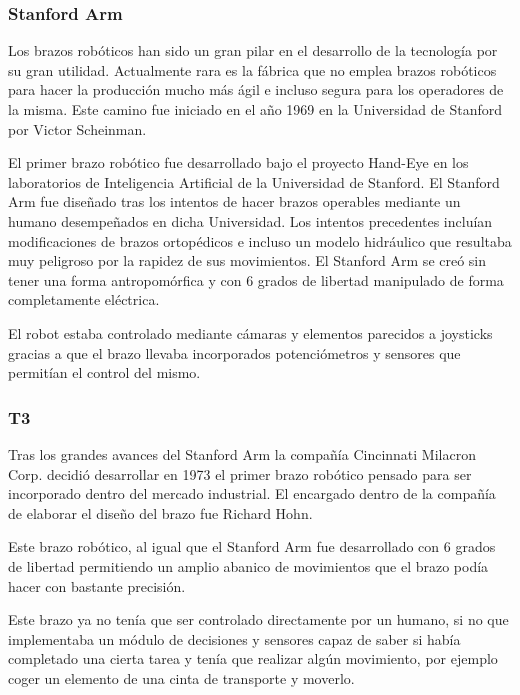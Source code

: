\subsubsection{Stanford Arm}

Los brazos robóticos han sido un gran pilar en el desarrollo de la tecnología por su gran utilidad. Actualmente rara es la fábrica que no emplea brazos robóticos para hacer la producción mucho más ágil e incluso segura para los operadores de la misma. Este camino fue iniciado en el año 1969 en la Universidad de Stanford por Victor Scheinman.

\vspace{10px}

El primer brazo robótico fue desarrollado bajo el proyecto Hand-Eye en los laboratorios de Inteligencia Artificial de la Universidad de Stanford. El Stanford Arm fue diseñado tras los intentos de hacer brazos operables mediante un humano desempeñados en dicha Universidad. Los intentos precedentes incluían modificaciones de brazos ortopédicos e incluso un modelo hidráulico que resultaba muy peligroso por la rapidez de sus movimientos. El Stanford Arm se creó sin tener una forma antropomórfica y con 6 grados de libertad manipulado de forma completamente eléctrica.

\vspace{10px}

El robot estaba controlado mediante cámaras y elementos parecidos a joysticks gracias a que el brazo llevaba incorporados potenciómetros y sensores que permitían el control del mismo.

\subsubsection{T3}

Tras los grandes avances del Stanford Arm la compañía Cincinnati Milacron Corp. decidió desarrollar en 1973 el primer brazo robótico pensado para ser incorporado dentro del mercado industrial. El encargado dentro de la compañía de elaborar el diseño del brazo fue Richard Hohn.

\vspace{10px}

Este brazo robótico, al igual que el Stanford Arm fue desarrollado con 6 grados de libertad permitiendo un amplio abanico de movimientos que el brazo podía hacer con bastante precisión.

\vspace{10px}

Este brazo ya no tenía que ser controlado directamente por un humano, si no que implementaba un módulo de decisiones y sensores capaz de saber si había completado una cierta tarea y tenía que realizar algún movimiento, por ejemplo coger un elemento de una cinta de transporte y moverlo.

